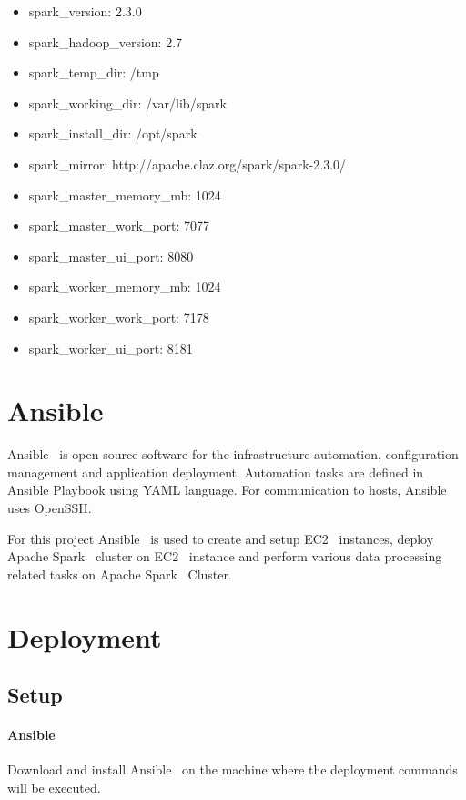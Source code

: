 \begin{itemize}
	\item spark_version: 2.3.0
	\item spark_hadoop_version: 2.7
	\item spark_temp_dir: /tmp
	\item spark_working_dir: /var/lib/spark
	\item spark_install_dir: /opt/spark
	\item spark_mirror: http://apache.claz.org/spark/spark-2.3.0/
	\item spark_master_memory_mb: 1024
	\item spark_master_work_port: 7077
	\item spark_master_ui_port: 8080
	\item spark_worker_memory_mb: 1024
	\item spark_worker_work_port: 7178
	\item spark_worker_ui_port: 8181
\end{itemize}

\section{Ansible}

Ansible~\cite{hid-sp18-511-www-ansible} is open source software for
the infrastructure automation, configuration management and
application deployment. Automation tasks are defined in Ansible
Playbook using YAML language. For communication to hosts,
Ansible~\cite{hid-sp18-511-www-ansible} uses OpenSSH.

For this project Ansible~\cite{hid-sp18-511-www-ansible} is used to
create and setup EC2~\cite{hid-sp18-511-www-ec2} instances, deploy
Apache Spark~\cite{hid-sp18-511-www-spark} cluster on
EC2~\cite{hid-sp18-511-www-ec2} instance and perform various data
processing related tasks on Apache Spark~\cite{hid-sp18-511-www-spark}
Cluster.

\section{Deployment}

\subsection{Setup}

\paragraph{Ansible}
Download and install Ansible~\cite{hid-sp18-511-www-ansible} on the
machine where the deployment commands will be executed.

